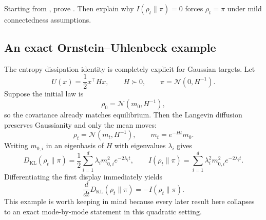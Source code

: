 \documentclass[11pt]{article}
\newif\ifshowsolutions
\newcommand{\SolutionBox}[2][10]{%
  \ifshowsolutions
    \begin{tcolorbox}[stat221panelgray,title={Solution}]
    #2
    \end{tcolorbox}
  \else
    \begin{tcolorbox}[stat221panelgray,unbreakable,title={Workspace}]
    \vspace{#1\baselineskip}
    \end{tcolorbox}
  \fi
}
\begin{document}
\begin{exercise}
\label{ex:entropy-dissipation}
Starting from , prove .
Then explain why $I(\rho_t\|\pi)=0$ forces $\rho_t=\pi$ under mild connectedness assumptions.
\end{exercise}
\SolutionBox[14]{%
We begin with
\[
D_{\mathrm{KL}}(\rho_t\|\pi)=\int \rho_t \log\frac{\rho_t}{\pi}\,dx.
\]
Since $\int \partial_t \rho_t\,dx=0$,
\[
\frac{d}{dt}D_{\mathrm{KL}}(\rho_t\|\pi)
=
\int \log\frac{\rho_t}{\pi}\,\partial_t \rho_t\,dx.
\]
Using the continuity-equation form,
\[
\partial_t \rho_t
=
\nabla\cdot\!\left(\rho_t\nabla\log\frac{\rho_t}{\pi}\right),
\]
we obtain
\begin{align*}
\frac{d}{dt}D_{\mathrm{KL}}(\rho_t\|\pi)
&=
\int \log\frac{\rho_t}{\pi}\,
\nabla\cdot\!\left(\rho_t\nabla\log\frac{\rho_t}{\pi}\right)\,dx \\
&=
-\int \norm{\nabla\log\frac{\rho_t}{\pi}}_2^2\,\rho_t\,dx \\
&=
-I(\rho_t\|\pi).
\end{align*}
If $I(\rho_t\|\pi)=0$, then $\nabla\log(\rho_t/\pi)=0$ almost everywhere on the support of $\rho_t$, so $\rho_t/\pi$ is constant on each connected component.
Both densities integrate to $1$, so that constant must be $1$, hence $\rho_t=\pi$ almost everywhere.%
}

\subsection{An exact Ornstein--Uhlenbeck example}
\label{subsec:ou-example}

The entropy dissipation identity is completely explicit for Gaussian targets.
Let
\[
U(x)=\frac12 x^\top Hx,
\qquad
H\succ 0,
\qquad
\pi=\mathcal{N}(0,H^{-1}).
\]
Suppose the initial law is
\[
\rho_0=\mathcal{N}(m_0,H^{-1}),
\]
so the covariance already matches equilibrium.
Then the Langevin diffusion preserves Gaussianity and only the mean moves:
\[
\rho_t=\mathcal{N}(m_t,H^{-1}),
\qquad
m_t=e^{-Ht}m_0.
\]
Writing $m_{0,i}$ in an eigenbasis of $H$ with eigenvalues $\lambda_i$ gives
\begin{equation}
  D_{\mathrm{KL}}(\rho_t\|\pi)
  =
  \frac12\sum_{i=1}^d \lambda_i m_{0,i}^2 e^{-2\lambda_i t},
  \qquad
  I(\rho_t\|\pi)
  =
  \sum_{i=1}^d \lambda_i^2 m_{0,i}^2 e^{-2\lambda_i t}.
  \label{eq:ou-kl-fisher}
\end{equation}
Differentiating the first display immediately yields
\[
\frac{d}{dt}D_{\mathrm{KL}}(\rho_t\|\pi)
=
-I(\rho_t\|\pi).
\]
This example is worth keeping in mind because every later result here collapses to an exact mode-by-mode statement in this quadratic setting.
\end{document}
